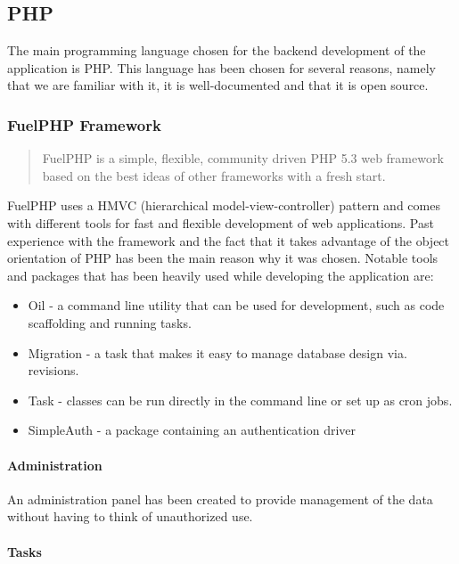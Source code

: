 \subsection{PHP}

The main programming language chosen for the backend development of the application is PHP. This language has been chosen for several reasons, namely that we are familiar with it, it is well-documented and that it is open source.

\subsubsection{FuelPHP Framework}

\begin{quote}
FuelPHP is a simple, flexible, community driven PHP 5.3 web framework based on the best ideas of other frameworks with a fresh start\cite{FuelPHP}.
\end{quote}


FuelPHP uses a HMVC (hierarchical model-view-controller) pattern and comes with different tools for fast and flexible development of web applications. Past experience with the framework and the fact that it takes advantage of the object orientation of PHP has been the main reason why it was chosen. Notable tools and packages that has been heavily used while developing the application are:

\begin{itemize}
\item Oil - a command line utility that can be used for development, such as code scaffolding and running tasks. 
\item Migration - a task that makes it easy to manage database design via. revisions.
\item Task - classes can be run directly in the command line or set up as cron jobs.
\item SimpleAuth - a package containing an authentication driver
\end{itemize}

\paragraph{Administration}

An administration panel has been created to provide management of the data without having to think of unauthorized use. 

\paragraph{Tasks}

